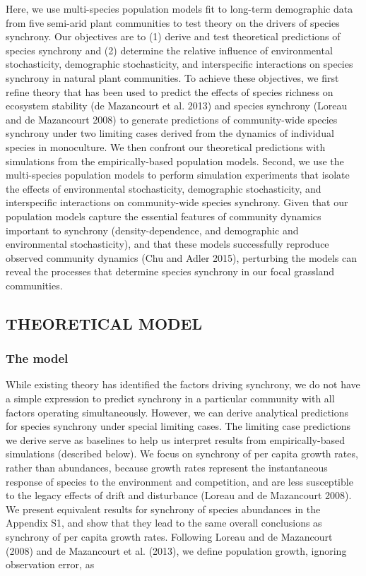 \documentclass[12pt,]{article}
\begin{document}
Here, we use multi-species population models fit to long-term
demographic data from five semi-arid plant communities to test theory on
the drivers of species synchrony. Our objectives are to (1) derive and
test theoretical predictions of species synchrony and (2) determine the
relative influence of environmental stochasticity, demographic
stochasticity, and interspecific interactions on species synchrony in
natural plant communities. To achieve these objectives, we first refine
theory that has been used to predict the effects of species richness on
ecosystem stability ({{de Mazancourt}} et al. 2013) and species
synchrony (Loreau and {{de Mazancourt}} 2008) to generate predictions of
community-wide species synchrony under two limiting cases derived from
the dynamics of individual species in monoculture. We then confront our
theoretical predictions with simulations from the empirically-based
population models. Second, we use the multi-species population models to
perform simulation experiments that isolate the effects of environmental
stochasticity, demographic stochasticity, and interspecific interactions
on community-wide species synchrony. Given that our population models
capture the essential features of community dynamics important to
synchrony (density-dependence, and demographic and environmental
stochasticity), and that these models successfully reproduce observed
community dynamics (Chu and Adler 2015), perturbing the models can
reveal the processes that determine species synchrony in our focal
grassland communities.

\subsection{THEORETICAL MODEL}\label{theoretical-model}

\subsubsection{The model}\label{the-model}

While existing theory has identified the factors driving synchrony, we
do not have a simple expression to predict synchrony in a particular
community with all factors operating simultaneously. However, we can
derive analytical predictions for species synchrony under special
limiting cases. The limiting case predictions we derive serve as
baselines to help us interpret results from empirically-based
simulations (described below). We focus on synchrony of per capita
growth rates, rather than abundances, because growth rates represent the
instantaneous response of species to the environment and competition,
and are less susceptible to the legacy effects of drift and disturbance
(Loreau and {{de Mazancourt}} 2008). We present equivalent results for
synchrony of species abundances in the Appendix S1, and show that they
lead to the same overall conclusions as synchrony of per capita growth
rates. Following Loreau and {{de Mazancourt}} (2008) and {{de
Mazancourt}} et al. (2013), we define population growth, ignoring
observation error, as
\end{document}
